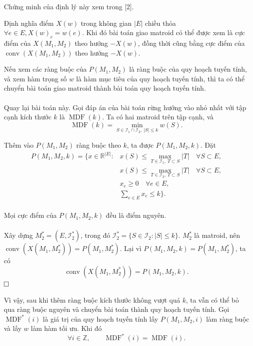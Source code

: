 \documentclass[11pt]{article}
\newcommand{\proofbox}{\ensuremath{\vcenter{\hrule height 0.45pt
  \hbox{\vrule width 0.45pt height 6pt\kern 6pt\vrule width 0.45pt}
  \hrule height 0.45pt}}}
\begin{document}
Chứng minh của định lý này xem trong [2].

Định nghĩa điểm \(X(w)\) trong không gian \(|E|\) chiều thỏa
\(\forall e\in E, X(w)_e=w(e)\). Khi đó bài toán giao matroid có thể được xem
là cực điểm của \(X(M_1,M_2)\) theo hướng \(-X(w)\), đồng thời cũng bằng cực
điểm của \(\operatorname{conv}(X(M_1,M_2))\) theo hướng \(-X(w)\).

Nếu xem các ràng buộc của \(P(M_1,M_2)\) là ràng buộc của quy hoạch tuyến tính,
và xem hàm trọng số \(w\) là hàm mục tiêu của quy hoạch tuyến tính, thì ta có
thể chuyển bài toán giao matroid thành bài toán quy hoạch tuyến tính.

\paragraph{}
Quay lại bài toán này. Gọi đáp án của bài toán rừng hướng vào nhỏ nhất với tập
cạnh kích thước \(k\) là \(\operatorname{MDF}(k)\). Ta có hai matroid trên tập
cạnh, và
\[
\operatorname{MDF}(k)=
\min_{S\in\mathcal{I}_1\cap\mathcal{I}_2,\ |S|\le k}w(S).
\]

Thêm vào \(P(M_1,M_2)\) ràng buộc theo \(k\), ta được \(P(M_1,M_2,k)\). Đặt
\[
\begin{aligned}
P(M_1,M_2,k)=\{x\in\mathbb{R}^{|E|}:&
x(S)\le \max_{T\in\mathcal{I}_1,\ T\subset S}|T|\quad \forall S\subset E,\\
&x(S)\le \max_{T\in\mathcal{I}_2,\ T\subset S}|T|\quad \forall S\subset E,\\
&x_e\ge 0\quad \forall e\in E,\\
&\sum_{e\in E}x_e\le k\}.
\end{aligned}
\]

\paragraph{}
Mọi cực điểm của \(P(M_1,M_2,k)\) đều là điểm nguyên.

\paragraph{}
Xây dựng \(M_2^*=(E,\mathcal{I}_2^*)\), trong đó
\(\mathcal{I}_2^*=\{S\in\mathcal{I}_2: |S|\le k\}\). \(M_2^*\) là matroid, nên
\(\operatorname{conv}(X(M_1,M_2^*))=P(M_1,M_2^*)\). Lại vì
\(P(M_1,M_2,k)=P(M_1,M_2^*)\), ta có
\[
\operatorname{conv}(X(M_1,M_2^*))=P(M_1,M_2,k).
\]
\proofbox

Vì vậy, sau khi thêm ràng buộc kích thước không vượt quá \(k\), ta vẫn có thể
bỏ qua ràng buộc nguyên và chuyển bài toán thành quy hoạch tuyến tính. Gọi
\(\operatorname{MDF}^*(i)\) là giá trị của quy hoạch tuyến tính lấy
\(P(M_1,M_2,i)\) làm ràng buộc và lấy \(w\) làm hàm tối ưu. Khi đó
\[
\forall i\in\mathbb{Z},\qquad \operatorname{MDF}^*(i)=\operatorname{MDF}(i).
\]
\end{document}
